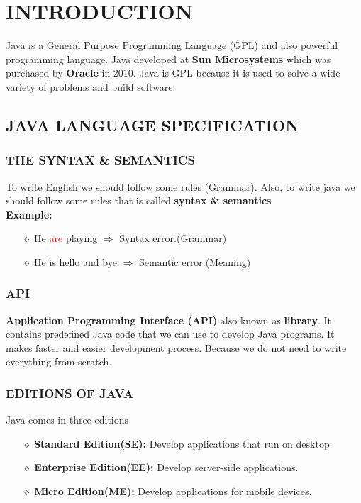\newpage
\chapter{INTRODUCTION}
Java is a General Purpose Programming Language (GPL) and also powerful programming language.
Java developed at \textbf{Sun Microsystems} which was purchased by \textbf{Oracle} in 2010.
Java is GPL because it is used to solve a wide variety of problems and build software.

\section{JAVA LANGUAGE SPECIFICATION}

\subsection{THE SYNTAX \& SEMANTICS}
To write English we should follow some rules (Grammar). Also, to write java we should follow some rules that is called \textbf{syntax \& semantics}\\
\textbf{Example:}
\begin{itemize}
	\item[{\LARGE $\diamond$}] He \textcolor{red}{are} playing $\Rightarrow$ Syntax error.(Grammar)
	\item[{\LARGE $\diamond$}] He is hello and bye $\Rightarrow$ Semantic error.(Meaning)
\end{itemize}


\subsection{API}
\textbf{Application Programming Interface (API)} also known as \textbf{library}. It contains predefined Java code that we can use to develop Java programs. It makes faster and easier development process. Because we do not need to write everything from scratch.

\subsection{EDITIONS OF JAVA}
Java comes in three editions
\begin{itemize}
	\item[{\LARGE $\diamond$}] \textbf{Standard Edition(SE):} Develop applications that run on desktop.
	\item[{\LARGE $\diamond$}] \textbf{Enterprise Edition(EE):} Develop server-side applications.
	\item[{\LARGE $\diamond$}] \textbf{Micro Edition(ME):} Develop applications for mobile devices.
\end{itemize}

